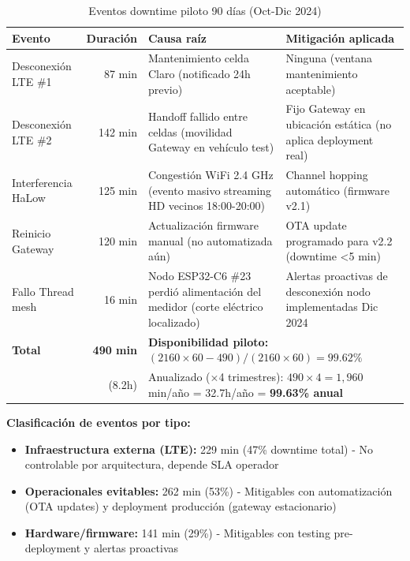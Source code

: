 \begin{table}[H]
\centering
\caption{Eventos downtime piloto 90 días (Oct-Dic 2024)}
\label{tab:res-downtime-events-pilot}
\small
\begin{tabular}{|p{3.5cm}|r|p{4.5cm}|p{3.5cm}|}
\hline
\rowcolor{gray!20}
\textbf{Evento} & \textbf{Duración} & \textbf{Causa raíz} & \textbf{Mitigación aplicada} \\
\hline
Desconexión LTE \#1 & 87 min & Mantenimiento celda Claro (notificado 24h previo) & Ninguna (ventana mantenimiento aceptable) \\
\hline
Desconexión LTE \#2 & 142 min & Handoff fallido entre celdas (movilidad Gateway en vehículo test) & Fijo Gateway en ubicación estática (no aplica deployment real) \\
\hline
Interferencia HaLow & 125 min & Congestión WiFi 2.4 GHz (evento masivo streaming HD vecinos 18:00-20:00) & Channel hopping automático (firmware v2.1) \\
\hline
Reinicio Gateway & 120 min & Actualización firmware manual (no automatizada aún) & OTA update programado para v2.2 (downtime <5 min) \\
\hline
Fallo Thread mesh & 16 min & Nodo ESP32-C6 \#23 perdió alimentación del medidor (corte eléctrico localizado) & Alertas proactivas de desconexión nodo implementadas Dic 2024 \\
\hline
\rowcolor{yellow!20}
\textbf{Total} & \textbf{490 min} & \multicolumn{2}{p{8cm}|}{\textbf{Disponibilidad piloto: $(2160 \times 60 - 490) / (2160 \times 60) = 99.62\%$}} \\
& (8.2h) & \multicolumn{2}{p{8cm}|}{Anualizado ($\times$4 trimestres): $490 \times 4 = 1,960$ min/año = 32.7h/año = \textbf{99.63\% anual}} \\
\hline
\end{tabular}
\end{table}

\textbf{Clasificación de eventos por tipo:}

\begin{itemize}
    \item \textbf{Infraestructura externa (LTE):} 229 min (47\% downtime total) - No controlable por arquitectura, depende SLA operador
    \item \textbf{Operacionales evitables:} 262 min (53\%) - Mitigables con automatización (OTA updates) y deployment producción (gateway estacionario)
    \item \textbf{Hardware/firmware:} 141 min (29\%) - Mitigables con testing pre-deployment y alertas proactivas
\end{itemize}

